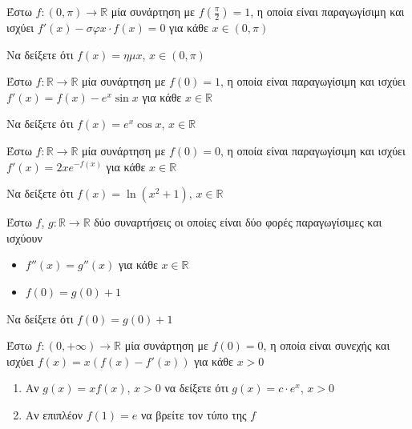 \documentclass{presentation}
\begin{document}
\begin{askisi}
  Έστω $f:(0,π)\to\mathbb{R}$ μία συνάρτηση με $f(\frac{π}{2})=1$, η οποία είναι παραγωγίσιμη και ισχύει $f'(x)-σφx\cdot f(x)=0$ για κάθε $x\in (0,π)$

  Να δείξετε ότι $f(x)=ημx$, $x\in (0,π)$

\end{askisi}

\begin{askisi}
  Έστω $f:\mathbb{R}\to\mathbb{R}$ μία συνάρτηση με $f(0)=1$, η οποία είναι παραγωγίσιμη και ισχύει $f'(x)=f(x)-e^x\sin x$ για κάθε $x\in\mathbb{R}$

  Να δείξετε ότι $f(x)=e^x\cos x$, $x\in\mathbb{R}$

\end{askisi}

\begin{askisi}
  Έστω $f:\mathbb{R}\to\mathbb{R}$ μία συνάρτηση με $f(0)=0$, η οποία είναι παραγωγίσιμη και ισχύει $f'(x)=2xe^{-f(x)}$ για κάθε $x\in\mathbb{R}$

  Να δείξετε ότι $f(x)=\ln (x^2+1)$, $x\in\mathbb{R}$

\end{askisi}

\begin{askisi}
  Έστω $f$, $g:\mathbb{R}\to\mathbb{R}$ δύο συναρτήσεις οι οποίες είναι δύο φορές παραγωγίσιμες και ισχύουν
  \begin{itemize}
    \item $f''(x)=g''(x)$ για κάθε $x\in\mathbb{R}$
    \item $f(0)=g(0)+1$
  \end{itemize}

  Να δείξετε ότι $f(0)=g(0)+1$

\end{askisi}

\begin{askisi}
  Έστω $f:(0,+\infty)\to\mathbb{R}$ μία συνάρτηση με $f(0)=0$, η οποία είναι συνεχής και ισχύει $f(x)=x(f(x)-f'(x))$ για κάθε $x>0$
  \begin{enumerate}
    \item<1-> Αν $g(x)=xf(x)$, $x>0$ να δείξετε ότι $g(x)=c\cdot e^x$, $x>0$
    \item<2-> Αν επιπλέον $f(1)=e$ να βρείτε τον τύπο της $f$
  \end{enumerate}

\end{askisi}
\end{document}

